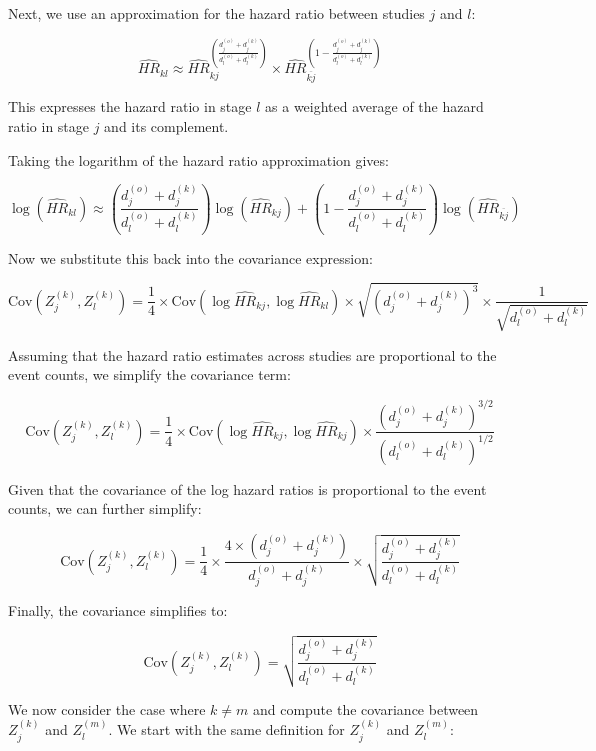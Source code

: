 \documentclass[11pt, a4paper]{article}\usepackage[]{graphicx}\usepackage[]{xcolor}
\begin{document}
{Next, we use an approximation for the hazard ratio between studies \( j \) and \( l \):

\[
\widehat{HR}_{kl} \approx \widehat{HR}_{kj}^{\left(\frac{d_j^{(o)} + d_j^{(k)}}{d_l^{(o)} + d_l^{(k)}}\right)} \times \widehat{HR}_{\overline{kj}}^{\left(1 - \frac{d_j^{(o)} + d_j^{(k)}}{d_l^{(o)} + d_l^{(k)}}\right)}
\]

This expresses the hazard ratio in stage \( l \) as a weighted average of the hazard ratio in stage \( j \) and its complement.

Taking the logarithm of the hazard ratio approximation gives:

\[
\log(\widehat{HR}_{kl}) \approx \left(\frac{d_j^{(o)} + d_j^{(k)}}{d_l^{(o)} + d_l^{(k)}}\right) \log(\widehat{HR}_{kj}) + \left(1 - \frac{d_j^{(o)} + d_j^{(k)}}{d_l^{(o)} + d_l^{(k)}}\right) \log(\widehat{HR}_{\overline{kj}})
\]

Now we substitute this back into the covariance expression:

\[
\text{Cov} \left( Z_j^{(k)} , Z_l^{(k)} \right) = \frac{1}{4} \times \text{Cov} \left( \log \widehat{HR}_{kj} , \log \widehat{HR}_{kl} \right) \times \sqrt{(d_j^{(o)} + d_j^{(k)})^3} \times \frac{1}{\sqrt{d_l^{(o)} + d_l^{(k)}}}
\]


Assuming that the hazard ratio estimates across studies are proportional to the event counts, we simplify the covariance term:

\[
\text{Cov} \left( Z_j^{(k)} , Z_l^{(k)} \right) = \frac{1}{4} \times \text{Cov} \left( \log \widehat{HR}_{kj} , \log \widehat{HR}_{kj} \right) \times \frac{(d_j^{(o)} + d_j^{(k)})^{3/2}}{(d_l^{(o)} + d_l^{(k)})^{1/2}}
\]

Given that the covariance of the log hazard ratios is proportional to the event counts, we can further simplify:

\[
\text{Cov} \left( Z_j^{(k)} , Z_l^{(k)} \right) = \frac{1}{4} \times \frac{4 \times (d_j^{(o)} + d_j^{(k)})}{d_j^{(o)} + d_j^{(k)}} \times \sqrt{\frac{d_j^{(o)} + d_j^{(k)}}{d_l^{(o)} + d_l^{(k)}}}
\]

Finally, the covariance simplifies to:

\[
\text{Cov} \left( Z_j^{(k)} , Z_l^{(k)} \right) = \sqrt{\frac{d_j^{(o)} + d_j^{(k)}}{d_l^{(o)} + d_l^{(k)}}}
\]



We now consider the case where \({k \neq m}\) and compute the covariance between \( Z_j^{(k)} \) and \( Z_l^{(m)} \). We start with the same definition for \( Z_j^{(k)} \) and \( Z_l^{(m)} \):

}
\end{document}
